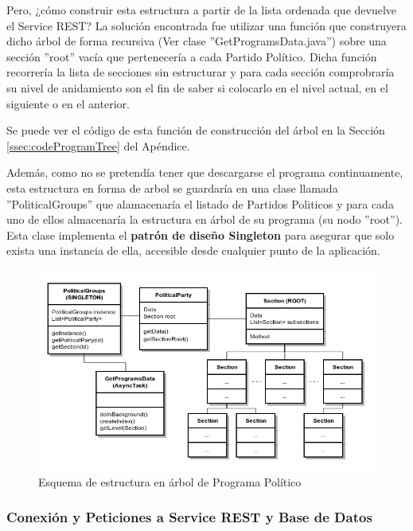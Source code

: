 	Pero, ¿cómo construir esta estructura a partir de la lista ordenada que devuelve el Service REST? La solución encontrada fue utilizar una función que construyera dicho árbol de forma recursiva (Ver clase ''GetProgramsData.java'') sobre una sección ''root'' vacía que pertenecería a cada Partido Político. Dicha función recorrería la lista de secciones sin estructurar y para cada sección comprobraría su nivel de anidamiento son el fin de saber si colocarlo en el nivel actual, en el siguiente o en el anterior.
	
	Se puede ver el código de esta función de construcción del árbol en la Sección \ref{ssec:codeProgramTree} del Apéndice.
	  
	Además, como no se pretendía tener que descargarse el programa continuamente, esta estructura en forma de arbol se guardaría en una clase llamada ''PoliticalGroups'' que alamacenaría el listado de Partidos Politicos y para cada uno de ellos almacenaría la estructura en árbol de su programa (su nodo ''root''). Esta clase implementa el \textbf{patrón de diseño Singleton} para asegurar que solo exista una instancia de ella, accesible desde cualquier punto de la aplicación. 
	  
	\begin{figure}[H]
	  \centering
	    \includegraphics[keepaspectratio, scale=0.6]{Media/Diagrams/classSectionTree.png}
	  \caption{Esquema de estructura en árbol de Programa Político}
	  \label{fig:classSecTree}
	\end{figure}	
	
	\subsubsection{Conexión y Peticiones a Service REST y Base de Datos}

